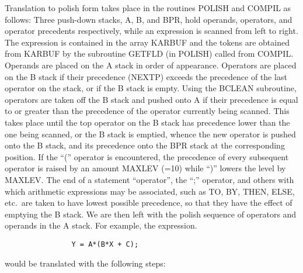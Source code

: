Translation to polish form takes place in the routines POLISH and
COMPIL as follows: Three push-down stacks, A, B, and BPR, hold
operands, operators, and operator precedents respectively, while an
expression is scanned from left to right.  The expression is contained
in the array KARBUF and the tokens are obtained from KARBUF by the
subroutine GETFLD (in POLISH) called from COMPIL.  Operands are placed
on the A stack in order of appearance.  Operators are placed on the B
stack if their precedence (NEXTP) exceeds the precedence of the last
operator on the stack, or if the B stack is empty.  Using the BCLEAN
subroutine, operators are taken off the B stack and pushed onto A if
their precedence is equal to or greater than the precedence of the
operator currently being scanned.  This takes place until the top
operator on the B stack has precedence lower than the one being
scanned, or the B stack is emptied, whence the new operator is pushed
onto the B stack, and its precedence onto the BPR stack at the
corresponding position.  If the ``('' operator is encountered, the
precedence of every subsequent operator is raised by an amount MAXLEV
(=10) while ``)'' lowers the level by MAXLEV.  The end of a statement
``operator'', the ``;'' operator, and others with which arithmetic
expressions may be associated, such as TO, BY, THEN, ELSE, etc.~are
taken to have lowest possible precedence, so that they have the effect
of emptying the B stack.  We are then left with the polish sequence of
operators and operands in the A stack.  For example, the expression.

\begin{verbatim}
                Y = A*(B*X + C);

\end{verbatim}
would be translated with the following steps:

